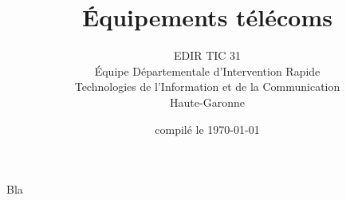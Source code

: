 \documentclass{beamer}
\begin{document}
\date{compilé le \today}
\title{Équipements télécoms}
\author{
	EDIR TIC 31\\
	\small{
        Équipe Départementale d’Intervention Rapide\\
        Technologies de l’Information et de la Communication\\
        Haute-Garonne
    }
}

\begin{frame}
	\titlepage
\end{frame}

\begin{frame}[Maxibox]
    Bla
\end{frame}
\end{document}

